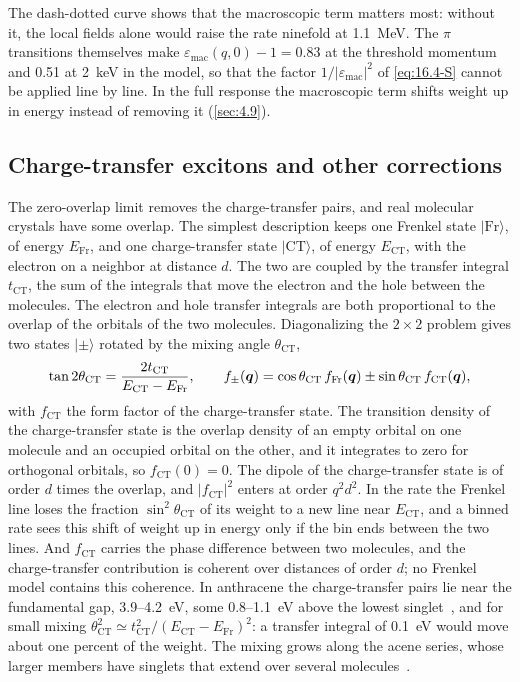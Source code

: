 The dash-dotted curve shows that the macroscopic term matters most: without it, the local fields alone would raise the rate ninefold at \SI{1.1}{MeV}. The $\pi$ transitions themselves make $\varepsilon_{\mathrm{mac}}(q,0) - 1 = 0.83$ at the threshold momentum and 0.51 at \SI{2}{keV} in the model, so that the factor $1/|\varepsilon_{\mathrm{mac}}|^2$ of \cref{eq:16.4-S} cannot be applied line by line. In the full response the macroscopic term shifts weight up in energy instead of removing it (\cref{sec:4.9}).

\subsection{Charge-transfer excitons and other corrections}\label{sec:16.4-ct}

The zero-overlap limit removes the charge-transfer pairs, and real molecular crystals have some overlap. The simplest description keeps one Frenkel state $|\mathrm{Fr}\rangle$, of energy $E_{\mathrm{Fr}}$, and one charge-transfer state $|\mathrm{CT}\rangle$, of energy $E_{\mathrm{CT}}$, with the electron on a neighbor at distance $d$. The two are coupled by the transfer integral $t_{\mathrm{CT}}$, the sum of the integrals that move the electron and the hole between the molecules. The electron and hole transfer integrals are both proportional to the overlap of the orbitals of the two molecules. Diagonalizing the $2\times2$ problem gives two states $|\pm\rangle$ rotated by the mixing angle $\theta_{\mathrm{CT}}$,
\begin{equation}
  \tan2\theta_{\mathrm{CT}} = \frac{2t_{\mathrm{CT}}}{E_{\mathrm{CT}} - E_{\mathrm{Fr}}} , \qquad
  f_\pm(\bm{q}) = \cos\theta_{\mathrm{CT}}\,f_{\mathrm{Fr}}(\bm{q}) \pm \sin\theta_{\mathrm{CT}}\,f_{\mathrm{CT}}(\bm{q}) ,
  \label{eq:16.4-CT}
\end{equation}
with $f_{\mathrm{CT}}$ the form factor of the charge-transfer state. The transition density of the charge-transfer state is the overlap density of an empty orbital on one molecule and an occupied orbital on the other, and it integrates to zero for orthogonal orbitals, so $f_{\mathrm{CT}}(0) = 0$. The dipole of the charge-transfer state is of order $d$ times the overlap, and $|f_{\mathrm{CT}}|^2$ enters at order $q^2d^2$. In the rate the Frenkel line loses the fraction $\sin^2\theta_{\mathrm{CT}}$ of its weight to a new line near $E_{\mathrm{CT}}$, and a binned rate sees this shift of weight up in energy only if the bin ends between the two lines. And $f_{\mathrm{CT}}$ carries the phase difference between two molecules, and the charge-transfer contribution is coherent over distances of order $d$; no Frenkel model contains this coherence. In anthracene the charge-transfer pairs lie near the fundamental gap, 3.9--\SI{4.2}{eV}, some 0.8--\SI{1.1}{eV} above the lowest singlet~\cite[Tables~II and~III]{rangel2016structural}, and for small mixing $\theta_{\mathrm{CT}}^2 \simeq t_{\mathrm{CT}}^2/(E_{\mathrm{CT}} - E_{\mathrm{Fr}})^2$: a transfer integral of \SI{0.1}{eV} would move about one percent of the weight. The mixing grows along the acene series, whose larger members have singlets that extend over several molecules~\cite[Sect.~III\,E]{rangel2016structural}.

